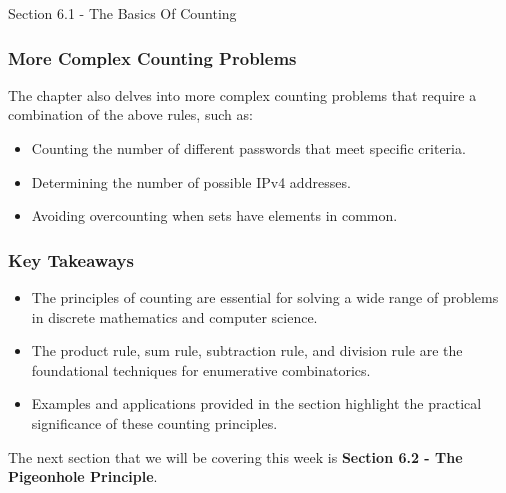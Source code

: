 \begin{notes}{Section 6.1 - The Basics Of Counting}
    \subsubsection*{More Complex Counting Problems}
    The chapter also delves into more complex counting problems that require a combination of the above rules, such as:
    \begin{itemize}
        \item Counting the number of different passwords that meet specific criteria.
        \item Determining the number of possible IPv4 addresses.
        \item Avoiding overcounting when sets have elements in common.
    \end{itemize}
    
    \subsubsection*{Key Takeaways}
    \begin{itemize}
        \item The principles of counting are essential for solving a wide range of problems in discrete mathematics and computer science.
        \item The product rule, sum rule, subtraction rule, and division rule are the foundational techniques for enumerative combinatorics.
        \item Examples and applications provided in the section highlight the practical significance of these counting principles.
    \end{itemize}
\end{notes}

The next section that we will be covering this week is \textbf{Section 6.2 - The Pigeonhole Principle}.

